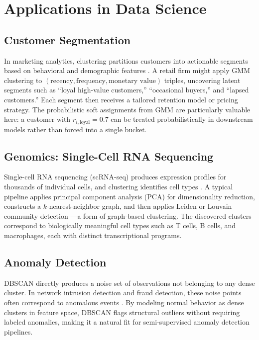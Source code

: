 \documentclass[conference]{IEEEtran}
\begin{document}
\section{Applications in Data Science}
\label{sec:applications}

\subsection{Customer Segmentation}

In marketing analytics, clustering partitions customers into actionable segments based on behavioral and demographic features \cite{wedel2000market}. A retail firm might apply GMM clustering to $(\text{recency}, \text{frequency}, \text{monetary value})$ triples, uncovering latent segments such as ``loyal high-value customers,'' ``occasional buyers,'' and ``lapsed customers.'' Each segment then receives a tailored retention model or pricing strategy. The probabilistic soft assignments from GMM are particularly valuable here: a customer with $r_{i,\text{loyal}}=0.7$ can be treated probabilistically in downstream models rather than forced into a single bucket.

\subsection{Genomics: Single-Cell RNA Sequencing}

Single-cell RNA sequencing (scRNA-seq) produces expression profiles for thousands of individual cells, and clustering identifies cell types \cite{luecken2019current}. A typical pipeline applies principal component analysis (PCA) for dimensionality reduction, constructs a $k$-nearest-neighbor graph, and then applies Leiden or Louvain community detection \cite{blondel2008fast}---a form of graph-based clustering. The discovered clusters correspond to biologically meaningful cell types such as T cells, B cells, and macrophages, each with distinct transcriptional programs.

\subsection{Anomaly Detection}

DBSCAN directly produces a noise set of observations not belonging to any dense cluster. In network intrusion detection and fraud detection, these noise points often correspond to anomalous events \cite{chandola2009anomaly}. By modeling normal behavior as dense clusters in feature space, DBSCAN flags structural outliers without requiring labeled anomalies, making it a natural fit for semi-supervised anomaly detection pipelines.
\end{document}
